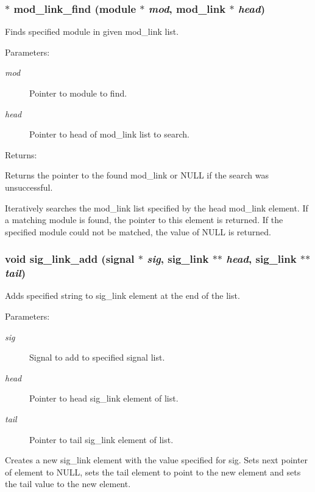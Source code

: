 \subsubsection{$\ast$ mod\_\-link\_\-find ({\bf module} $\ast$ {\em mod}, {\bf mod\_\-link} $\ast$ {\em head})}\label{link_8c_a11}


Finds specified module in given mod\_\-link list.

\begin{Desc}
\item[Parameters: ]\par
\begin{description}
\item[{\em 
mod}]Pointer to module to find. \item[{\em 
head}]Pointer to head of mod\_\-link list to search.\end{description}
\end{Desc}
\begin{Desc}
\item[Returns: ]\par
Returns the pointer to the found mod\_\-link or NULL if the search was unsuccessful.\end{Desc}
Iteratively searches the mod\_\-link list specified by the head mod\_\-link element. If a matching module is found, the pointer to this element is returned. If the specified module could not be matched, the value of NULL is returned. 
\subsubsection{\setlength{\rightskip}{0pt plus 5cm}void sig\_\-link\_\-add ({\bf signal} $\ast$ {\em sig}, {\bf sig\_\-link} $\ast$$\ast$ {\em head}, {\bf sig\_\-link} $\ast$$\ast$ {\em tail})}\label{link_8c_a2}


Adds specified string to sig\_\-link element at the end of the list.

\begin{Desc}
\item[Parameters: ]\par
\begin{description}
\item[{\em 
sig}]Signal to add to specified signal list. \item[{\em 
head}]Pointer to head sig\_\-link element of list. \item[{\em 
tail}]Pointer to tail sig\_\-link element of list.\end{description}
\end{Desc}
Creates a new sig\_\-link element with the value specified for sig. Sets next pointer of element to NULL, sets the tail element to point to the new element and sets the tail value to the new element. 
